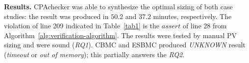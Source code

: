 \documentclass[10pt,conference]{IEEEtran}
\begin{document}
\textbf{Results.}  CPAchecker was able to synthesize the optimal sizing of both case studies: the result was produced in $50.2$ and $37.2$ minutes, respectively. 
The violation of line 209 indicated in Table~\ref{tab1} is the $assert$ of line 28 from Algorithm~\ref{alg:verification-algorithm}. The results were tested by manual PV sizing and were sound (\textit{RQ1}). %
CBMC and ESBMC produced \textit{UNKNOWN} result (\textit{timeout} or \textit{out of memory}); this partially answers the \textit{RQ2}.
%
\end{document}
